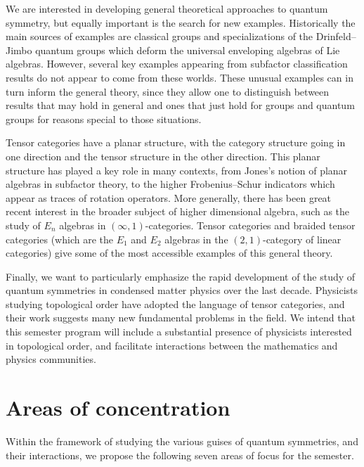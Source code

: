 \documentclass[12pt]{article}
\begin{document}
We are interested in developing general theoretical approaches to quantum symmetry, but equally important is the search for new examples. Historically the main sources of examples are classical groups and specializations of the Drinfeld--Jimbo quantum groups which deform the universal enveloping algebras of Lie algebras. However, several key examples appearing from subfactor classification results do not appear to come from these worlds. These unusual examples can in turn inform the general theory, since they allow one to distinguish between results that may hold in general and ones that just hold for groups and quantum groups for reasons special to those situations.

Tensor categories have a planar structure, with the category structure going in one direction and the tensor structure in the other direction. This planar structure has played a key role in many contexts, from Jones's notion of planar algebras in subfactor theory, to the higher Frobenius--Schur indicators which appear as traces of rotation operators. More generally, there has been great recent interest in the broader subject of higher dimensional algebra, such as the study of $E_n$ algebras in $(\infty,1)$-categories. Tensor categories and braided tensor categories (which are the $E_1$ and $E_2$ algebras in the $(2,1)$-category of linear categories) give some of the most accessible examples of this general theory.

Finally, we want to particularly emphasize the rapid development of the study of quantum symmetries in condensed matter physics over the last decade. Physicists studying topological order have adopted the language of tensor categories, and their work suggests many new fundamental problems in the field. We intend that this semester program will include a substantial presence of physicists interested in topological order, and facilitate interactions between the mathematics and physics communities.

\section{Areas of concentration}
Within the framework of studying the various guises of quantum symmetries, and their interactions, we propose the following seven areas of focus for the semester.
\end{document}
